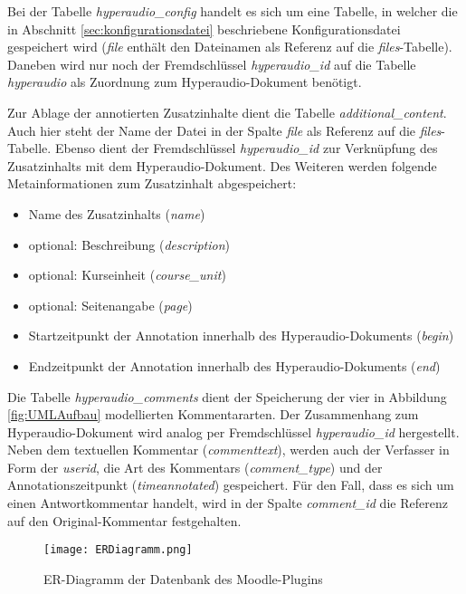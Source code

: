 Bei der Tabelle \textit{hyperaudio\_config} handelt es sich um eine Tabelle, in welcher die in Abschnitt \ref{sec:konfigurationsdatei} beschriebene Konfigurationsdatei gespeichert wird (\textit{file} enthält den Dateinamen als Referenz auf die \textit{files}-Tabelle). Daneben wird nur noch der Fremdschlüssel \textit{hyperaudio\_id} auf die Tabelle \textit{hyperaudio} als Zuordnung zum Hyperaudio-Dokument benötigt.


Zur Ablage der annotierten Zusatzinhalte dient die Tabelle \textit{additional\_content}. Auch hier steht der Name der Datei in der Spalte \textit{file} als Referenz auf die \textit{files}-Tabelle. Ebenso dient der Fremdschlüssel \textit{hyperaudio\_id} zur Verknüpfung des Zusatzinhalts mit dem Hyperaudio-Dokument. Des Weiteren werden folgende Metainformationen zum Zusatzinhalt abgespeichert:

\begin{itemize}

\item Name des Zusatzinhalts (\textit{name})
\item optional: Beschreibung (\textit{description})
\item optional: Kurseinheit (\textit{course\_unit})
\item optional: Seitenangabe (\textit{page})
\item Startzeitpunkt der Annotation innerhalb des Hyperaudio-Dokuments (\textit{begin})
\item Endzeitpunkt der Annotation innerhalb des Hyperaudio-Dokuments (\textit{end})

\end{itemize}

Die Tabelle \textit{hyperaudio\_comments} dient der Speicherung der vier in Abbildung \ref{fig:UMLAufbau} modellierten Kommentararten. Der Zusammenhang zum Hyperaudio-Dokument wird analog per Fremdschlüssel \textit{hyperaudio\_id} hergestellt. Neben dem textuellen Kommentar (\textit{commenttext}), werden auch der Verfasser in Form der \textit{userid}, die Art des Kommentars (\textit{comment\_type}) und der Annotationszeitpunkt (\textit{timeannotated}) gespeichert. Für den Fall, dass es sich um einen Antwortkommentar handelt, wird in der Spalte \textit{comment\_id} die Referenz auf den Original-Kommentar festgehalten.

\begin{figure}[h!]
\texttt{[image: ERDiagramm.png]}
\caption{\label{fig:ERDiagramm}ER-Diagramm der Datenbank des Moodle-Plugins}
\end{figure}


